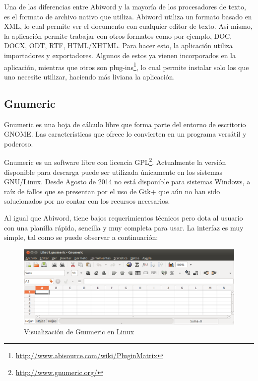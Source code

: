 \documentclass[12pt]{article}
\begin{document}
Una de las diferencias entre Abiword y la mayoría de los procesadores de texto, es el formato de archivo nativo que utiliza. Abiword utiliza un formato basado en XML, lo cual permite ver el documento con cualquier editor de texto. Así mismo, la aplicación permite trabajar con otros formatos como por ejemplo, DOC, DOCX, ODT, RTF, HTML/XHTML. Para hacer esto, la aplicación utiliza importadores y exportadores. Algunos de estos ya vienen incorporados en la aplicación, mientras que otros son plug-ins\footnote{\url{http://www.abisource.com/wiki/PluginMatrix}}, lo cual permite instalar solo los que uno necesite utilizar, haciendo más liviana la aplicación. 


\subsection{Gnumeric}

Gnumeric es una hoja de cálculo libre que forma parte del entorno de escritorio GNOME. Las características que ofrece lo convierten en un programa versátil y poderoso. 

Gnumeric es un software libre con licencia GPL\footnote{\url{http://www.gnumeric.org/}}. Actualmente la versión disponible para descarga puede ser utilizada únicamente en los sistemas GNU/Linux. Desde Agosto de 2014 no está disponible para sistemas Windows, a raíz de fallos  que se presentan por el uso de Gtk+ que aún no han sido solucionados por no contar con los recursos necesarios.

Al igual que Abiword, tiene bajos requerimientos técnicos pero dota al usuario con una planilla rápida, sencilla y muy completa para usar. La interfaz es muy simple, tal como se puede observar a continuación:

\begin{figure}[H]
\centering
\includegraphics[width=1\textwidth]{gnumeric_linux.png}
\renewcommand{\figurename}{Fig.}
\caption{Visualización de Gnumeric en Linux}
\label{contexto:figura}
\end{figure}
\end{document}
